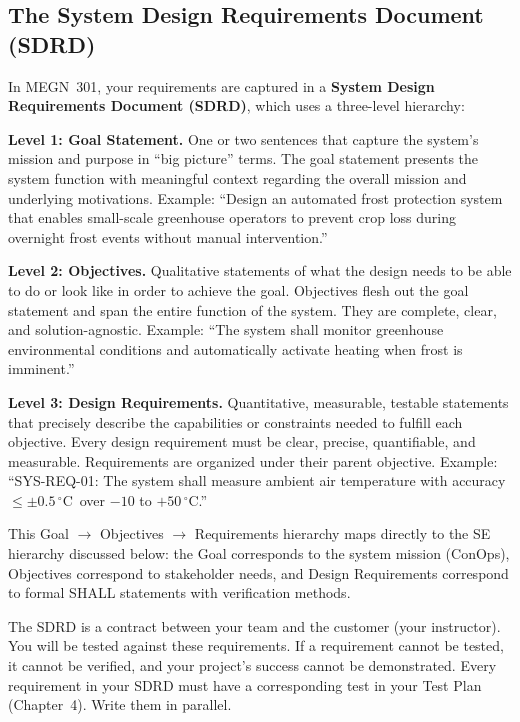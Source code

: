 \documentclass[11pt,letterpaper,twoside,openany]{book}
\newcommand{\degC}{\ensuremath{{}^{\circ}\text{C}}}
\begin{document}
\subsection{The System Design Requirements Document (SDRD)}
In MEGN~301, your requirements are captured in a \textbf{System Design Requirements Document (SDRD)}, which uses a three-level hierarchy:

\textbf{Level 1: Goal Statement.} One or two sentences that capture the system's mission and purpose in ``big picture'' terms. The goal statement presents the system function with meaningful context regarding the overall mission and underlying motivations. Example: ``Design an automated frost protection system that enables small-scale greenhouse operators to prevent crop loss during overnight frost events without manual intervention.''

\textbf{Level 2: Objectives.} Qualitative statements of what the design needs to be able to do or look like in order to achieve the goal. Objectives flesh out the goal statement and span the entire function of the system. They are complete, clear, and solution-agnostic. Example: ``The system shall monitor greenhouse environmental conditions and automatically activate heating when frost is imminent.''

\textbf{Level 3: Design Requirements.} Quantitative, measurable, testable statements that precisely describe the capabilities or constraints needed to fulfill each objective. Every design requirement must be clear, precise, quantifiable, and measurable. Requirements are organized under their parent objective. Example: ``SYS-REQ-01: The system shall measure ambient air temperature with accuracy $\leq \pm 0.5$\,\degC\ over $-10$ to $+50$\,\degC.''

This Goal $\to$ Objectives $\to$ Requirements hierarchy maps directly to the SE hierarchy discussed below: the Goal corresponds to the system mission (ConOps), Objectives correspond to stakeholder needs, and Design Requirements correspond to formal SHALL statements with verification methods.

\begin{warningbox}
The SDRD is a contract between your team and the customer (your instructor). You will be tested against these requirements. If a requirement cannot be tested, it cannot be verified, and your project's success cannot be demonstrated. Every requirement in your SDRD must have a corresponding test in your Test Plan (Chapter~4). Write them in parallel.
\end{warningbox}
\end{document}
